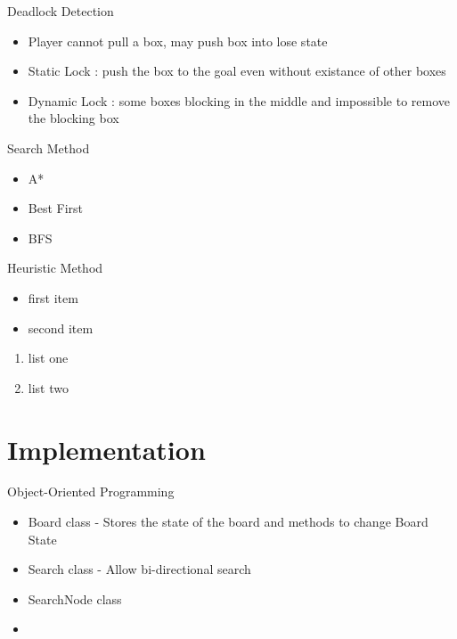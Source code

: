\documentclass{beamer}
\begin{document}
\begin{frame}
  Deadlock Detection
  \begin{itemize}
  \item Player cannot pull a box, may push box into lose state
  \item Static Lock : push the box to the goal even without existance of other boxes
  \item Dynamic Lock : some boxes blocking in the middle and impossible to remove the blocking box

  \end{itemize}
\end{frame}

\begin{frame}
  Search Method
  \begin{itemize}
  \item A*
  \item Best First
  \item BFS
  \end{itemize}

\end{frame}

\begin{frame}
  Heuristic Method
  \begin{itemize}
  \item first item
  \item second item
  \end{itemize}
  \begin{enumerate}
  \item list one
  \item list two
  \end{enumerate}
\end{frame}

\section{Implementation}
\begin{frame}
Object-Oriented Programming
  \begin{itemize}
  \item Board class - Stores the state of the board and methods to change Board State
  \item Search class - Allow bi-directional search
  \item SearchNode class
  \item 
  \end{itemize}
\end{frame}
\end{document}
